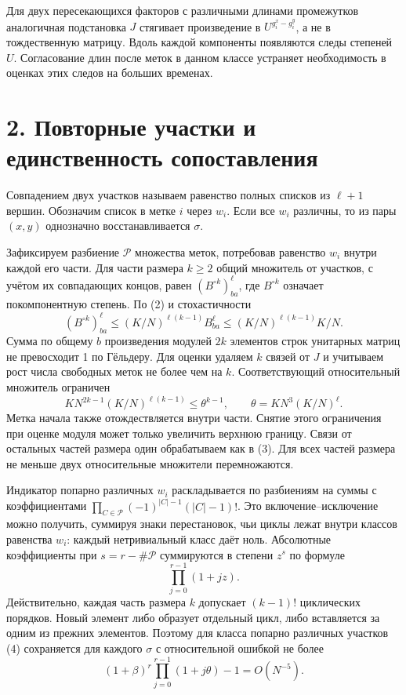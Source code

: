 \documentclass[11pt,a4paper]{article}
\newcommand{\sect}[1]{\section*{\sffamily\color{ink}#1}}
\begin{document}
Для двух пересекающихся факторов с различными длинами промежутков аналогичная подстановка $J$ стягивает произведение в $U^{g_i^x-g_i^y}$, а не в тождественную матрицу. Вдоль каждой компоненты появляются следы степеней $U$. Согласование длин после меток в данном классе устраняет необходимость в оценках этих следов на больших временах.
\newpage
\sect{2. Повторные участки и единственность сопоставления}
Совпадением двух участков называем равенство полных списков из $\ell+1$ вершин. Обозначим список в метке $i$ через $w_i$. Если все $w_i$ различны, то из пары $(x,y)$ однозначно восстанавливается $\sigma$.

Зафиксируем разбиение $\mathcal P$ множества меток, потребовав равенство $w_i$ внутри каждой его части. Для части размера $k\ge2$ общий множитель от участков, с учётом их совпадающих концов, равен $(B^{\circ k})^\ell_{ba}$, где $B^{\circ k}$ означает покомпонентную степень. По (2) и стохастичности
\[
     (B^{\circ k})^\ell_{ba}
        \le (K/N)^{\ell(k-1)} B^\ell_{ba}
        \le (K/N)^{\ell(k-1)} K/N .                                 \tag{5}
\]
Сумма по общему $b$ произведения модулей $2k$ элементов строк унитарных матриц не превосходит 1 по Гёльдеру. Для оценки удаляем $k$ связей от $J$ и учитываем рост числа свободных меток не более чем на $k$. Соответствующий относительный множитель ограничен
\[
     K N^{2k-1}(K/N)^{\ell(k-1)}
                 \le \theta^{k-1},\qquad \theta=K N^3(K/N)^\ell .
\]
Метка начала также отождествляется внутри части. Снятие этого ограничения при оценке модуля может только увеличить верхнюю границу. Связи от остальных частей размера один обрабатываем как в (3). Для всех частей размера не меньше двух относительные множители перемножаются.

Индикатор попарно различных $w_i$ раскладывается по разбиениям на суммы с коэффициентами $\prod_{C\in\mathcal P}(-1)^{|C|-1}(|C|-1)!$. Это включение--исключение можно получить, суммируя знаки перестановок, чьи циклы лежат внутри классов равенства $w_i$: каждый нетривиальный класс даёт ноль. Абсолютные коэффициенты при $s=r-\#\mathcal P$ суммируются в степени $z^s$ по формуле
\[
                         \prod_{j=0}^{r-1}(1+jz).                    \tag{6}
\]
Действительно, каждая часть размера $k$ допускает $(k-1)!$ циклических порядков. Новый элемент либо образует отдельный цикл, либо вставляется за одним из прежних элементов.
Поэтому для класса попарно различных участков (4) сохраняется для каждого $\sigma$ с относительной ошибкой не более
\[
              (1+\beta)^r\prod_{j=0}^{r-1}(1+j\theta)-1=O(N^{-5}).
                                                                     \tag{7}
\]
\end{document}
